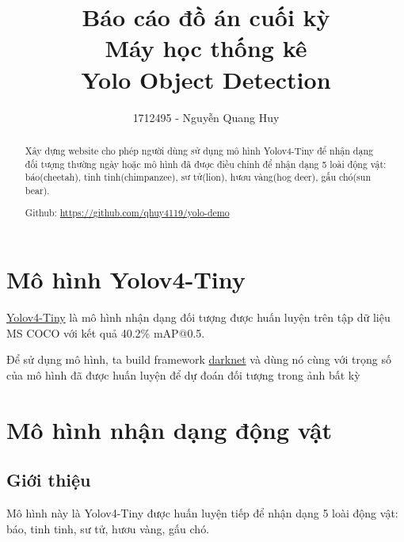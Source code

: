 \documentclass[20pt, a4paper]{article}
\begin{document}
\title{Báo cáo đồ án cuối kỳ \\
Máy học thống kê\\
Yolo Object Detection}
\author{1712495 - Nguyễn Quang Huy}
\maketitle

\renewcommand{\abstractname}{Tóm tắt}
\begin{abstract}
	Xây dựng website cho phép người dùng sử dụng mô hình Yolov4-Tiny để nhận dạng đối tượng thường ngày 
	hoặc mô hình đã được điều chỉnh để nhận dạng 5 loài động vật: báo(cheetah), tinh tinh(chimpanzee), sư tử(lion), hươu vàng(hog deer), gấu chó(sun bear). 

	Github: \url{https://github.com/qhuy4119/yolo-demo}
\end{abstract}

\renewcommand{\contentsname}{Mục lục}
\tableofcontents

\section{Mô hình Yolov4-Tiny}

\href{https://github.com/AlexeyAB/darknet#pre-trained-models}{Yolov4-Tiny} 
là mô hình nhận dạng đối tượng được huấn luyện trên tập dữ liệu MS COCO với kết quả 40.2\% mAP@0.5.

Để sử dụng mô hình, ta build framework \href{https://github.com/AlexeyAB/darknet}{darknet} và dùng nó cùng với trọng số của mô hình đã được huấn luyện để dự đoán đối tượng trong ảnh bất kỳ

\section{Mô hình nhận dạng động vật}
\subsection{Giới thiệu}
Mô hình này là Yolov4-Tiny được huấn luyện tiếp để nhận dạng 5 loài động vật: báo, tinh tinh, sư tử, hươu vàng, gấu chó.
\end{document}
